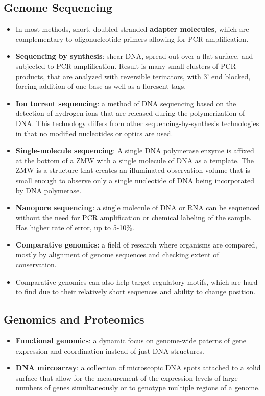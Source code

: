 \documentclass[12pt,a4paper]{article}
\begin{document}
\subsection{Genome Sequencing}
\begin{itemize}
    \item In most methods, short, doubled stranded \textbf{adapter molecules}, which are complementary to oligonucleotide primers allowing for PCR amplification.
    \item \textbf{Sequencing by synthesis}: shear DNA, spread out over a flat surface, and subjected to PCR amplification. Result is many small clusters of PCR products, that are analyzed with reversible terinators, with 3' end blocked, forcing addition of one base as well as a floresent tags.
    \item \textbf{Ion torrent sequencing}: a method of DNA sequencing based on the detection of hydrogen ions that are released during the polymerization of DNA. This technology differs from other sequencing-by-synthesis technologies in that no modified nucleotides or optics are used.
    \item \textbf{Single-molecule sequencing}: A single DNA polymerase enzyme is affixed at the bottom of a ZMW with a single molecule of DNA as a template. The ZMW is a structure that creates an illuminated observation volume that is small enough to observe only a single nucleotide of DNA being incorporated by DNA polymerase.
    \item \textbf{Nanopore sequencing}: a single molecule of DNA or RNA can be sequenced without the need for PCR amplification or chemical labeling of the sample. Has higher rate of error, up to 5-10\%.
    \item \textbf{Comparative genomics}: a field of research where organisms are compared, mostly by alignment of genome sequences and checking extent of conservation.
    \item Comparative genomics can also help target regulatory motifs, which are hard to find due to their relatively short sequences and ability to change position. 
\end{itemize}

\subsection{Genomics and Proteomics}
\begin{itemize}
    \item \textbf{Functional genomics}: a dynamic focus on genome-wide paterns of gene expression and coordination instead of just DNA structures.
    \item \textbf{DNA mircoarray}: a collection of microscopic DNA spots attached to a solid surface that allow for the measurement of the expression levels of large numbers of genes simultaneously or to genotype multiple regions of a genome. 
\end{itemize}
\end{document}
